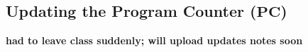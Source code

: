 \documentclass[11pt]{article}
\begin{document}
\vskip 1cm
\subsection{Updating the Program Counter ($\mathrm{\textbf{PC}}$)}

\textbf{had to leave class suddenly; will upload updates notes soon}

\end{document}
